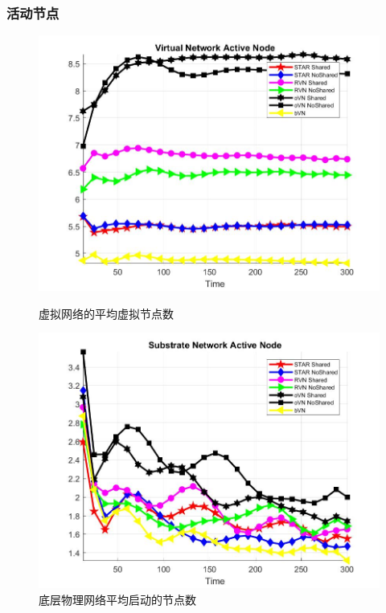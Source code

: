 \begin{frame}
\frametitle{活动节点}
\begin{figure}[htbp]
\centering
\begin{minipage}{0.4\textwidth}
\centering
\includegraphics[width=\textwidth]{figures/ActiveNodeAverageVirtualNetwork}
\caption{虚拟网络的平均虚拟节点数}\label{fig:ActiveNodeAverageVirtualNetwork}
\end{minipage}
\begin{minipage}{0.4\textwidth}
\centering
\includegraphics[width=\textwidth]{figures/ActiveNodeAverageSubstrateNetwork}
\caption{底层物理网络平均启动的节点数}\label{fig:ActiveNodeAverageSubstrateNetwork}
\end{minipage}

\end{figure}
\end{frame}
